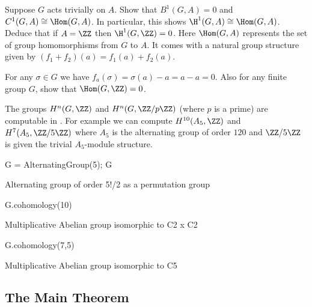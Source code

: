 \begin{exercise}\label{ex:H1hom}
  Suppose $G$ acts trivially on $A$.
  Show that $B^1(G,A)=0$ and $C^1(G,A) \cong \Hom(G,A)$.
  In particular, this shows $\H^1(G,A) \cong \Hom(G,A)$.
  Deduce that if $A = \ZZ$ then $\H^1(G,\ZZ) = 0$.
  Here $\Hom(G,A)$ represents the set of group homomorphisms
  from $G$ to $A$. It comes with a natural group structure
  given by $(f_1+f_2)(a) = f_1(a)+f_2(a)$.

  \begin{hint}
    For any $\sigma\in G$ we have
    $f_a(\sigma) = \sigma(a) - a = a - a = 0$.
    Also for any finite group $G$, show that $\Hom(G,\ZZ) = 0$.
  \end{hint}
\end{exercise}

\begin{example}
  The groups $H^n(G,\ZZ)$ and $H^n(G,\ZZ/p\ZZ)$ (where $p$ is a prime)
  are computable in {\Sage}. For example we can compute $H^{10}(A_5,\ZZ)$
  and $H^{7}(A_5,\ZZ/5\ZZ)$ where $A_5$ is the alternating group of
  order $120$ and $\ZZ/5\ZZ$ is given the trivial $A_5$-module structure.
\begin{sagecode}
\begin{sagecell}
G = AlternatingGroup(5); G
\end{sagecell}
\begin{sageout}
Alternating group of order 5!/2 as a permutation group
\end{sageout}
\begin{sagecell}
G.cohomology(10)
\end{sagecell}
\begin{sageout}
Multiplicative Abelian group isomorphic to C2 x C2
\end{sageout}
\begin{sagecell}
G.cohomology(7,5)
\end{sagecell}
\begin{sageout}
Multiplicative Abelian group isomorphic to C5
\end{sageout}
\end{sagecode}
\end{example}

\subsection{The Main Theorem}

